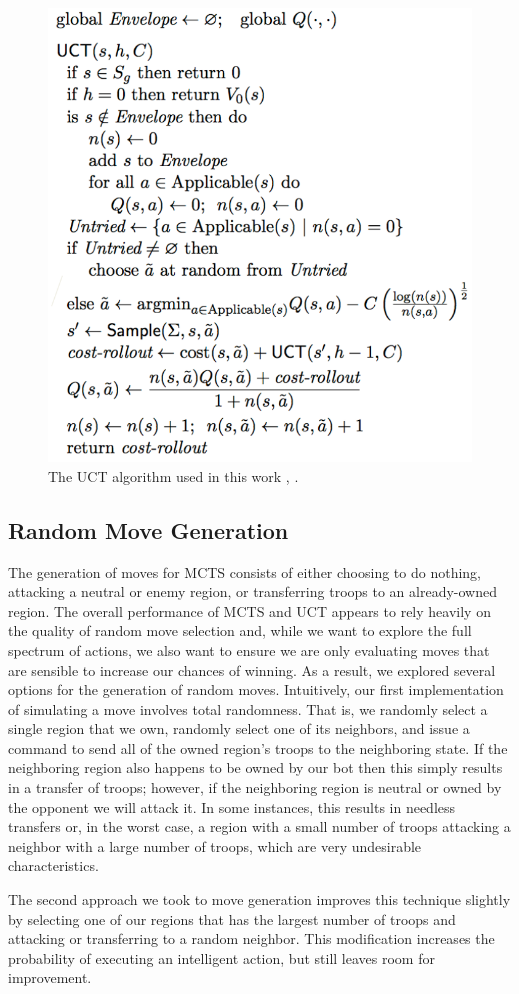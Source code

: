\documentclass[a4paper,11pt]{article}
\begin{document}
%
\begin{figure}[!htbp]
  \centering
  \includegraphics[width=0.45\columnwidth]{uct_algorithm}
  \caption{The UCT algorithm used in this work \cite{Nau2015}, \cite{NauLecture}.}
  \label{fig:uct_alg}
\end{figure}
%


\subsection{Random Move Generation}\label{sec:move_gen}
The generation of moves for MCTS consists of either choosing to do nothing, attacking a neutral 
or enemy region, or transferring troops to an already-owned region. The overall performance of 
MCTS and UCT appears to rely heavily on the quality of random move selection and, while we want to
explore the full spectrum of actions, we also want to ensure we are only evaluating moves that are
sensible to increase our chances of winning. As a result, we explored several options for the 
generation of random moves. Intuitively, our first implementation of simulating a move involves total 
randomness.  That is, we randomly select a single region that we own, randomly select one of its 
neighbors, and issue a command to send all of the owned region's troops to the neighboring state.  
If the neighboring region also happens to be owned by our bot then this simply results in a transfer 
of troops; however, if the neighboring region is neutral or owned by the opponent we will attack it. 
In some instances, this results in needless transfers or, in the worst case, a region with a small 
number of troops attacking a neighbor with a large number of troops, which are very undesirable 
characteristics. 

The second approach we took to move generation improves this technique slightly by selecting one of 
our regions that has the largest number of troops and attacking or transferring to a random neighbor.  
This modification increases the probability of executing an intelligent action, but still leaves room 
for improvement.
\end{document}
